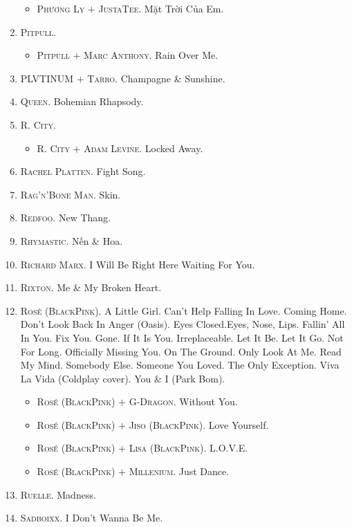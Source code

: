 \documentclass[oneside]{book}
\numberwithin{equation}{section}
\begin{document}
\begin{enumerate}
	\begin{itemize}
		\item \textsc{Phương Ly $+$ JustaTee.} Mặt Trời Của Em.
	\end{itemize}
	\item \textsc{Pitpull.}
	\begin{itemize}
		\item \textsc{Pitpull $+$ Marc Anthony.} Rain Over Me.
	\end{itemize}
	\item \textsc{PLVTINUM $+$ Tarro.} Champagne \& Sunshine.
	\item \textsc{Queen.} Bohemian Rhapsody.
	\item \textsc{R. City.}
	\begin{itemize}
		\item \textsc{R. City $+$ Adam Levine.} Locked Away.
	\end{itemize}
	\item \textsc{Rachel Platten.} Fight Song.
	\item \textsc{Rag'n'Bone Man.} Skin.
	\item \textsc{Redfoo.} New Thang.
	\item \textsc{Rhymastic.} Nến \& Hoa.
	\item \textsc{Richard Marx.} I Will Be Right Here Waiting For You.
	\item \textsc{Rixton.} Me \& My Broken Heart.
	\item \textsc{Ros\'e (BlackPink).} A Little Girl. Can't Help Falling In Love. Coming Home. Don't Look Back In Anger (Oasis). Eyes Closed.Eyes, Nose, Lips. Fallin' All In You. Fix You. Gone. If It Is You. Irreplaceable. Let It Be. Let It Go. Not For Long. Officially Missing You. On The Ground. Only Look At Me. Read My Mind. Somebody Else. Someone You Loved. The Only Exception. Viva La Vida (Coldplay cover). You \& I (Park Bom).
	\begin{itemize}
		\item \textsc{Ros\'e (BlackPink) $+$ G-Dragon.} Without You.
		\item \textsc{Ros\'e (BlackPink) $+$ Jiso (BlackPink).} Love Yourself.
		\item \textsc{Ros\'e (BlackPink) $+$ Lisa (BlackPink).} L.O.V.E.
		\item \textsc{Ros\'e (BlackPink) $+$ Millenium.} Just Dance.
	\end{itemize}
	\item \textsc{Ruelle.} Madness.
	\item \textsc{Sadboixx.} I Don't Wanna Be Me.

\end{enumerate}
\end{document}
